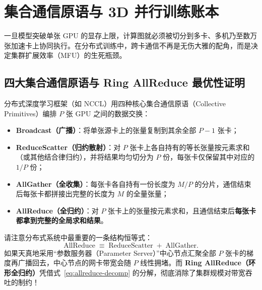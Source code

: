 \section{集合通信原语与 3D 并行训练账本}
\label{sec:3d-parallelism}

一旦模型突破单张 GPU 的显存上限，计算图就必须被切分到多卡、多机乃至数万张加速卡上协同执行。在分布式训练中，跨卡通信不再是无伤大雅的配角，而是决定集群扩展效率（MFU）的生死瓶颈。

\subsection{四大集合通信原语与 Ring AllReduce 最优性证明}

分布式深度学习框架（如 NCCL）用四种核心集合通信原语（Collective Primitives）编排 $P$ 张 GPU 之间的数据交换：
\begin{itemize}
  \item \textbf{Broadcast（广播）}：将单张源卡上的张量复制到其余全部 $P-1$ 张卡；
  \item \textbf{ReduceScatter（归约散射）}：对 $P$ 张卡上各自持有的等长张量按元素求和（或其他结合律归约），并将结果均匀切分为 $P$ 份，每张卡仅保留其中对应的 $1/P$ 份；
  \item \textbf{AllGather（全收集）}：每张卡各自持有一份长度为 $M/P$ 的分片，通信结束后每张卡都拼接出完整的长度为 $M$ 的全量张量；
  \item \textbf{AllReduce（全归约）}：对 $P$ 张卡上的张量按元素求和，且通信结束后\textbf{每张卡都拿到完整的全局求和结果}。
\end{itemize}
请注意分布式系统中最重要的一条结构恒等式：
\begin{equation}
  \mathrm{AllReduce} \;\equiv\; \mathrm{ReduceScatter} \;+\; \mathrm{AllGather}.
  \label{eq:allreduce-decomp}
\end{equation}
如果天真地采用“参数服务器（Parameter Server）”中心节点汇聚全部 $P$ 张卡的梯度再广播回去，中心节点的网卡带宽会随 $P$ 线性拥堵。而 \textbf{Ring AllReduce（环形全归约）}凭借式~\eqref{eq:allreduce-decomp} 的分解，彻底消除了集群规模对带宽吞吐的制约！

